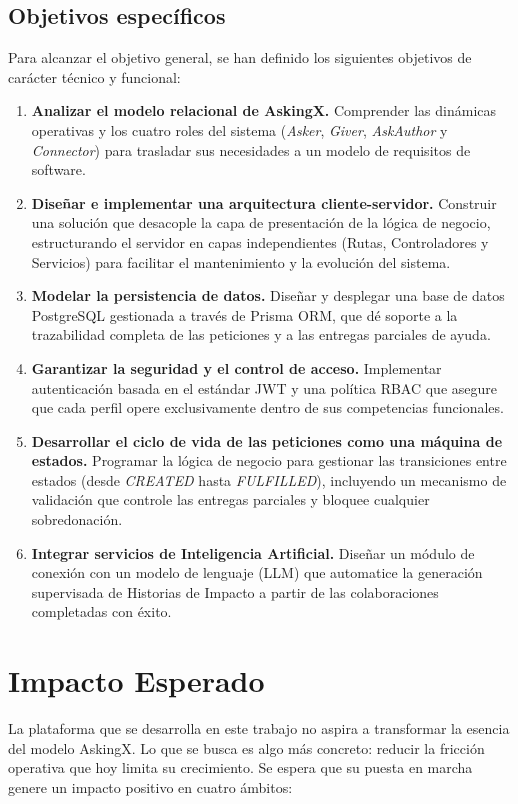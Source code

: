 \documentclass[11pt,oneside,spanish,listoffigures,listoftables]{tfgetsinf}
\begin{document}
\subsection{Objetivos específicos}
Para alcanzar el objetivo general, se han definido los siguientes objetivos de carácter técnico y funcional:

\begin{enumerate}
    \item \textbf{Analizar el modelo relacional de AskingX.} Comprender las dinámicas operativas y los cuatro roles del sistema (\textit{Asker}, \textit{Giver}, \textit{AskAuthor} y \textit{Connector}) para trasladar sus necesidades a un modelo de requisitos de software.

    \item \textbf{Diseñar e implementar una arquitectura cliente-servidor.} Construir una solución que desacople la capa de presentación de la lógica de negocio, estructurando el servidor en capas independientes (Rutas, Controladores y Servicios) para facilitar el mantenimiento y la evolución del sistema.

    \item \textbf{Modelar la persistencia de datos.} Diseñar y desplegar una base de datos PostgreSQL gestionada a través de Prisma ORM, que dé soporte a la trazabilidad completa de las peticiones y a las entregas parciales de ayuda.

    \item \textbf{Garantizar la seguridad y el control de acceso.} Implementar autenticación basada en el estándar JWT y una política RBAC que asegure que cada perfil opere exclusivamente dentro de sus competencias funcionales.

    \item \textbf{Desarrollar el ciclo de vida de las peticiones como una máquina de estados.} Programar la lógica de negocio para gestionar las transiciones entre estados (desde \textit{CREATED} hasta \textit{FULFILLED}), incluyendo un mecanismo de validación que controle las entregas parciales y bloquee cualquier sobredonación.

    \item \textbf{Integrar servicios de Inteligencia Artificial.} Diseñar un módulo de conexión con un modelo de lenguaje (LLM) que automatice la generación supervisada de Historias de Impacto a partir de las colaboraciones completadas con éxito.
\end{enumerate}
\section{Impacto Esperado}
La plataforma que se desarrolla en este trabajo no aspira a transformar la esencia del modelo AskingX. Lo que se busca es algo más concreto: reducir la fricción operativa que hoy limita su crecimiento. Se espera que su puesta en marcha genere un impacto positivo en cuatro ámbitos:
\end{document}
